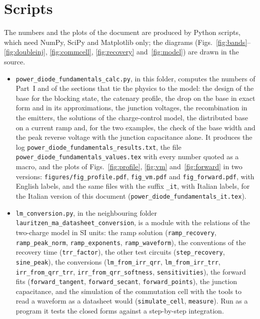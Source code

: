 \documentclass[10pt,a4paper]{scrartcl}
\begin{document}
\section{Scripts}
\label{app:scripts}
The numbers and the plots of the document are produced by Python scripts, which need NumPy, SciPy and Matplotlib only; the diagrams (Figs.~\ref{fig:bands}--\ref{fig:doubleinj}, \ref{fig:commcell}, \ref{fig:recovery} and~\ref{fig:model}) are drawn in the source.
\begin{itemize}
\emergencystretch=3em\raggedright
\item \texttt{power\_diode\_fundamentals\_calc.py}, in this folder, computes the numbers of Part~I and of the sections that tie the physics to the model: the design of the base for the blocking state, the catenary profile, the drop on the base in exact form and in its approximations, the junction voltages, the recombination in the emitters, the solutions of the charge-control model, the distributed base on a current ramp and, for the two examples, the check of the base width and the peak reverse voltage with the junction capacitance alone. It produces the log \texttt{power\_diode\_fundamentals\_results.txt}, the file \texttt{power\_diode\_fundamentals\_values.tex} with every number quoted as a macro, and the plots of Figs.~\ref{fig:profile}, \ref{fig:vm} and~\ref{fig:forward} in two versions: \texttt{figures/fig\_profile.pdf}, \texttt{fig\_vm.pdf} and \texttt{fig\_forward.pdf}, with English labels, and the same files with the suffix \texttt{\_it}, with Italian labels, for the Italian version of this document (\texttt{power\_diode\_fundamentals\_it.tex}).
\item \texttt{lm\_conversion.py}, in the neighbouring folder \texttt{lauritzen\_ma\_datasheet\_conversion}, is a module with the relations of the two-charge model in SI units: the ramp solution (\texttt{ramp\_recovery}, \texttt{ramp\_peak\_norm}, \texttt{ramp\_exponents}, \texttt{ramp\_waveform}), the conventions of the recovery time (\texttt{trr\_factor}), the other test circuits (\texttt{step\_recovery}, \texttt{sine\_peak}), the conversions (\texttt{lm\_from\_irr\_qrr}, \texttt{lm\_from\_irr\_trr}, \texttt{irr\_from\_qrr\_trr}, \texttt{irr\_from\_qrr\_softness}, \texttt{sensitivities}), the forward fits (\texttt{forward\_tangent}, \texttt{forward\_secant}, \texttt{forward\_points}), the junction capacitance, and the simulation of the commutation cell with the tools to read a waveform as a datasheet would (\texttt{simulate\_cell}, \texttt{measure}). Run as a program it tests the closed forms against a step-by-step integration.

\end{itemize}
\end{document}
